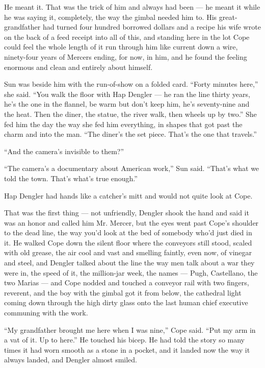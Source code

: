 \documentclass[11pt,openany]{book}
\begin{document}
He meant it. That was the trick of him and always had been --- he meant it while he was saying it, completely, the way the gimbal needed him to. His great-grandfather had turned four hundred borrowed dollars and a recipe his wife wrote on the back of a feed receipt into all of this, and standing here in the lot Cope could feel the whole length of it run through him like current down a wire, ninety-four years of Mercers ending, for now, in him, and he found the feeling enormous and clean and entirely about himself.

Sun was beside him with the run-of-show on a folded card. ``Forty minutes here,'' she said. ``You walk the floor with Hap Dengler --- he ran the line thirty years, he's the one in the flannel, be warm but don't keep him, he's seventy-nine and the heat. Then the diner, the statue, the river walk, then wheels up by two.'' She fed him the day the way she fed him everything, in shapes that got past the charm and into the man. ``The diner's the set piece. That's the one that travels.''

``And the camera's invisible to them?''

``The camera's a documentary about American work,'' Sun said. ``That's what we told the town. That's what's true enough.''

Hap Dengler had hands like a catcher's mitt and would not quite look at Cope.

That was the first thing --- not unfriendly, Dengler shook the hand and said it was an honor and called him Mr. Mercer, but the eyes went past Cope's shoulder to the dead line, the way you'd look at the bed of somebody who'd just died in it. He walked Cope down the silent floor where the conveyors still stood, scaled with old grease, the air cool and vast and smelling faintly, even now, of vinegar and steel, and Dengler talked about the line the way men talk about a war they were in, the speed of it, the million-jar week, the names --- Pugh, Castellano, the two Marias --- and Cope nodded and touched a conveyor rail with two fingers, reverent, and the boy with the gimbal got it from below, the cathedral light coming down through the high dirty glass onto the last human chief executive communing with the work.

``My grandfather brought me here when I was nine,'' Cope said. ``Put my arm in a vat of it. Up to here.'' He touched his bicep. He had told the story so many times it had worn smooth as a stone in a pocket, and it landed now the way it always landed, and Dengler almost smiled.
\end{document}

